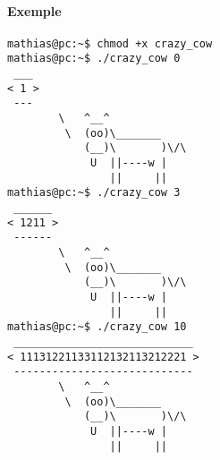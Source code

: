 \documentclass[french, 10pt, a4paper]{article}
\begin{document}
\paragraph{Exemple}
\begin{verbatim}
mathias@pc:~$ chmod +x crazy_cow
mathias@pc:~$ ./crazy_cow 0
 ___
< 1 >
 ---
		\   ^__^
		 \  (oo)\_______
			(__)\       )\/\
			 U  ||----w |
				||     ||
mathias@pc:~$ ./crazy_cow 3
 ______
< 1211 >
 ------
		\   ^__^
		 \  (oo)\_______
			(__)\       )\/\
			 U  ||----w |
				||     ||
mathias@pc:~$ ./crazy_cow 10
 ____________________________
< 11131221133112132113212221 >
 ----------------------------
		\   ^__^
		 \  (oo)\_______
			(__)\       )\/\
			 U  ||----w |
				||     ||
\end{verbatim}
\end{document}
